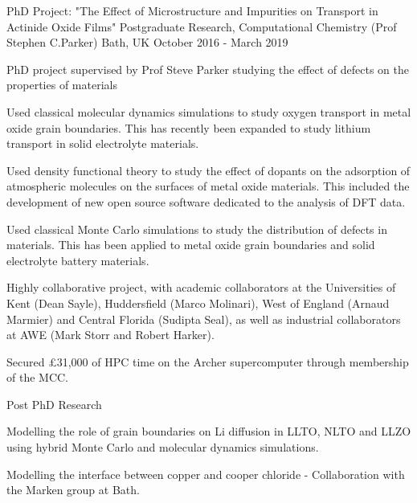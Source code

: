   \begin{cventries}
    \cventry
      {PhD Project: "The Effect of Microstructure and Impurities on Transport in Actinide Oxide Films"}
      {Postgraduate Research, Computational Chemistry (Prof Stephen C.Parker)}
      {Bath, UK}
      {October 2016 - March 2019}
      {
        \begin{cvitems}
          \item{PhD project supervised by Prof Steve Parker studying the effect of defects on the properties of materials}
          \item{Used classical molecular dynamics simulations to study oxygen transport in metal oxide grain boundaries. This has recently been expanded to study lithium transport in solid electrolyte materials.}
          \item{Used density functional theory to study the effect of dopants on the adsorption of atmospheric molecules on the surfaces of metal oxide materials. This included the development of new open source software dedicated to the analysis of DFT data.}
          \item{Used classical Monte Carlo simulations to study the distribution of defects in materials. This has been applied to metal oxide grain boundaries and solid electrolyte battery materials.}
          \item{Highly collaborative project, with academic collaborators at the Universities of Kent (Dean Sayle), Huddersfield (Marco Molinari), West of England (Arnaud Marmier) and Central Florida (Sudipta Seal), as well as industrial collaborators at AWE (Mark Storr and Robert Harker).}
          \item {Secured £31,000 of HPC time on the Archer supercomputer through membership of the MCC.}
        \end{cvitems}
      }
      \cventry
      {Post PhD Research}
      {}
      {}
      {}
      {
        \begin{cvitems}
          \item {Modelling the role of grain boundaries on Li diffusion in LLTO, NLTO and LLZO using hybrid Monte Carlo and molecular dynamics simulations.}
          \item {Modelling the interface between copper and cooper chloride - Collaboration with the Marken group at Bath.}
        \end{cvitems}
      }
  

\end{cventries}
